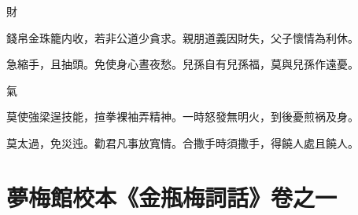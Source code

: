 財

\begin{myquote0}
錢帛金珠籠内收，若非公道少貪求。親朋道義因財失，父子懷情為利休。

急縮手，且抽頭。免使身心晝夜愁。兒孫自有兒孫福，莫與兒孫作遠憂。
\end{myquote0}

氣

\begin{myquote0}
莫使強梁逞技能，揎拳裸袖弄精神。一時怒發無明火，到後憂煎祸及身。

莫太過，免災迍。勸君凡事放寬情。合撒手時須撒手，得饒人處且饒人。
\end{myquote0}

\part*{夢梅館校本《金瓶梅詞話》卷之一}

